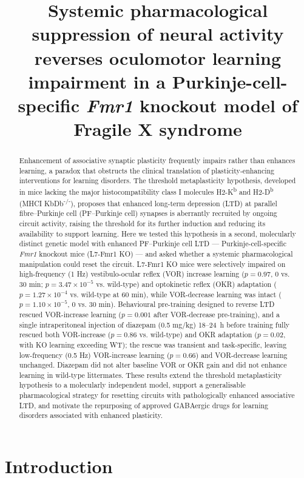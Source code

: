 \documentclass[11pt]{article}
\title{Systemic pharmacological suppression of neural activity reverses
oculomotor learning impairment in a Purkinje-cell-specific \textit{Fmr1}
knockout model of Fragile X syndrome}
\author{}
\date{}
\begin{document}
\maketitle

\begin{abstract}
Enhancement of associative synaptic plasticity frequently impairs rather than
enhances learning, a paradox that obstructs the clinical translation of
plasticity-enhancing interventions for learning disorders. The threshold
metaplasticity hypothesis, developed in mice lacking the major
histocompatibility class I molecules H2-K\textsuperscript{b} and H2-D\textsuperscript{b}
(MHCI KbDb\textsuperscript{-/-}), proposes that enhanced long-term depression
(LTD) at parallel fibre--Purkinje cell (PF--Purkinje cell) synapses is
aberrantly recruited by ongoing circuit activity, raising the threshold for
its further induction and reducing its availability to support learning.
Here we tested this hypothesis in a second, molecularly distinct genetic
model with enhanced PF--Purkinje cell LTD --- Purkinje-cell-specific
\textit{Fmr1} knockout mice (L7-Fmr1 KO) --- and asked whether a systemic
pharmacological manipulation could reset the circuit. L7-Fmr1 KO mice were
selectively impaired on high-frequency (1 Hz) vestibulo-ocular reflex
(VOR) increase learning ($p = 0.97$, 0 vs. 30 min; $p = 3.47 \times 10^{-5}$
vs. wild-type) and optokinetic reflex (OKR) adaptation
($p = 1.27 \times 10^{-4}$ vs. wild-type at 60 min), while VOR-decrease
learning was intact ($p = 1.10 \times 10^{-5}$, 0 vs. 30 min). Behavioural
pre-training designed to reverse LTD rescued VOR-increase learning
($p = 0.001$ after VOR-decrease pre-training), and a single intraperitoneal
injection of diazepam (0.5 mg/kg) 18--24~h before training fully rescued
both VOR-increase ($p = 0.86$ vs. wild-type) and OKR adaptation
($p = 0.02$, with KO learning exceeding WT); the rescue was transient and
task-specific, leaving low-frequency (0.5 Hz) VOR-increase learning
($p = 0.66$) and VOR-decrease learning unchanged. Diazepam did not alter
baseline VOR or OKR gain and did not enhance learning in wild-type
littermates. These results extend the threshold metaplasticity hypothesis
to a molecularly independent model, support a generalisable pharmacological
strategy for resetting circuits with pathologically enhanced associative
LTD, and motivate the repurposing of approved GABAergic drugs for
learning disorders associated with enhanced plasticity.
\end{abstract}

\section{Introduction}
\end{document}
